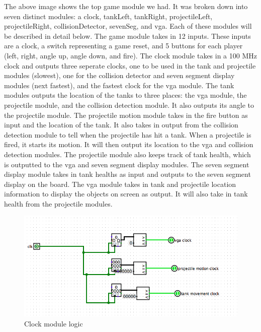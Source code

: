 \documentclass{article}
\begin{document}
The above image shows the top game module we had. It was broken down into seven distinct modules: a clock, tankLeft, tankRight, projectileLeft, projectileRight, collisionDetector, sevenSeg, and vga. Each of these modules will be described in detail below. The game module takes in 12 inputs. These inputs are a clock, a switch representing a game reset, and 5 buttons for each player (left, right, angle up, angle down, and fire). The clock module takes in a 100 MHz clock and outputs three seperate clocks, one to be used in the tank and projectile modules (slowest), one for the collision detector and seven segment display modules (next fastest), and the fastest clock for the vga module. The tank modules outputs the location of the tanks to three places: the vga module, the projectile module, and the collision detection module. It also outputs its angle to the projectile module. The projectile motion module takes in the fire button as input and the location of the tank. It also takes in output from the collision detection module to tell when the projectile has hit a tank. When a projectile is fired, it starts its motion. It will then output its location to the vga and collision detection modules. The projectile module also keeps track of tank health, which is outputted to the vga and seven segment display modules. The seven segment display module takes in tank healths as input and outputs to the seven segment display on the board. The vga module takes in tank and projectile location information to display the objects on screen as output. It will also take in tank health from the projectile modules.


\begin{figure}[H]
	\begin{center}
		\includegraphics[width=1\textwidth]{clock.png} 
		\caption{Clock module logic}
	\end{center}
\end{figure}
\end{document}
